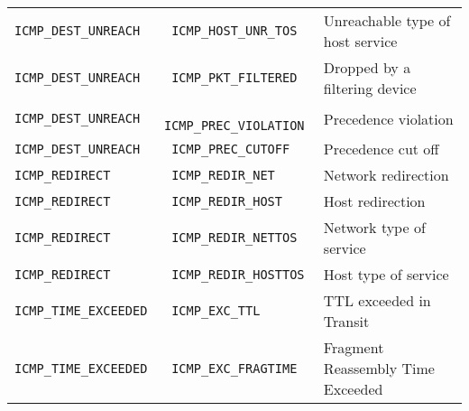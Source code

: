 \documentclass[documentation]{subfiles}
\begin{document}
\begin{longtable}{>{\tt}l>{\tt}ll}
    ICMP\_DEST\_UNREACH  & ICMP\_HOST\_UNR\_TOS  & Unreachable type of host service \\
    ICMP\_DEST\_UNREACH  & ICMP\_PKT\_FILTERED   & Dropped by a filtering device \\
    ICMP\_DEST\_UNREACH  & ICMP\_PREC\_VIOLATION & Precedence violation \\
    ICMP\_DEST\_UNREACH  & ICMP\_PREC\_CUTOFF    & Precedence cut off \\
    ICMP\_REDIRECT       & ICMP\_REDIR\_NET      & Network redirection \\
    ICMP\_REDIRECT       & ICMP\_REDIR\_HOST     & Host redirection \\
    ICMP\_REDIRECT       & ICMP\_REDIR\_NETTOS   & Network type of service \\
    ICMP\_REDIRECT       & ICMP\_REDIR\_HOSTTOS  & Host type of service \\
    ICMP\_TIME\_EXCEEDED & ICMP\_EXC\_TTL        & TTL exceeded in Transit\\
    ICMP\_TIME\_EXCEEDED & ICMP\_EXC\_FRAGTIME   & Fragment Reassembly Time Exceeded\\
    \bottomrule
\end{longtable}
\end{document}
